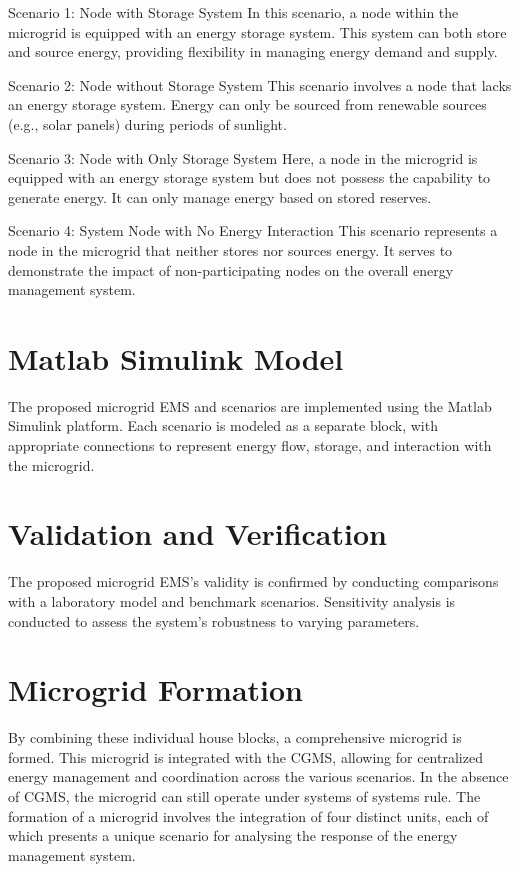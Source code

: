 \begin{list}{}{}
	\item Scenario 1: Node with Storage System In this scenario, a node within the microgrid is equipped with an energy storage system. This system can both store and source energy, providing flexibility in managing energy demand and supply.\par
	\item Scenario 2: Node without Storage System This scenario involves a node that lacks an energy storage system. Energy can only be sourced from renewable sources (e.g., solar panels) during periods of sunlight.\par
	\item Scenario 3: Node with Only Storage System Here, a node in the microgrid is equipped with an energy storage system but does not possess the capability to generate energy. It can only manage energy based on stored reserves.\par
	\item Scenario 4: System Node with No Energy Interaction This scenario represents a node in the microgrid that neither stores nor sources energy. It serves to demonstrate the impact of non-participating nodes on the overall energy management system.\par
\end{list}

\section{Matlab Simulink Model}
The proposed microgrid EMS and scenarios are implemented using the Matlab Simulink platform. Each scenario is modeled as a separate block, with appropriate connections to represent energy flow, storage, and interaction with the microgrid.\par
\section{Validation and Verification}
The proposed microgrid EMS's validity is confirmed by conducting comparisons with a laboratory model and benchmark scenarios. Sensitivity analysis is conducted to assess the system's robustness to varying parameters.\par
\section{Microgrid Formation}
By combining these individual house blocks, a comprehensive microgrid is formed. This microgrid is integrated with the CGMS, allowing for centralized energy management and coordination across the various scenarios. In the absence of CGMS, the microgrid can still operate under systems of systems rule. The formation of a microgrid involves the integration of four distinct units, each of which presents a unique scenario for analysing the response of the energy management system.
